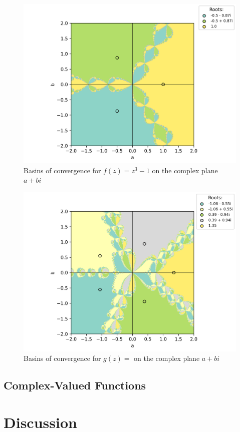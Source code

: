 \documentclass[10pt,a4paper]{article}
\begin{document}
		\begin{figure}[h]
			\caption{Basins of convergence for $f(z) = z^3 - 1$ on the complex plane $a+bi$}
			\includegraphics[scale=0.75]{figure4}
		\end{figure}
	
		\begin{figure}[h]
			\caption{Basins of convergence for $g(z) =$ on the complex plane $a+bi$}
			\includegraphics[scale=0.75]{figure5}
		\end{figure}
		
		\subsection{Complex-Valued Functions}
		
	\section{Discussion}
\end{document}
